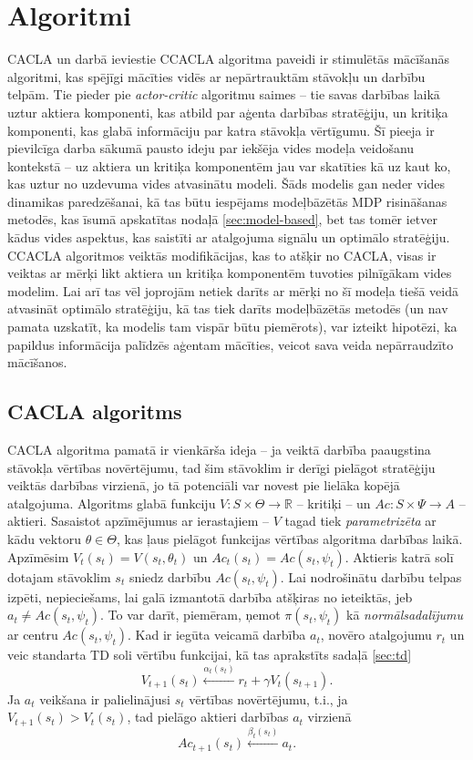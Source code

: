 \documentclass{ludis} %
\begin{document}
\chapter{Algoritmi}
CACLA un darbā ieviestie CCACLA algoritma paveidi ir stimulētās mācīšanās
algoritmi, kas spējīgi mācīties vidēs ar nepārtrauktām stāvokļu un darbību
telpām. Tie pieder pie \textit{actor-critic} algoritmu saimes -- tie savas
darbības laikā uztur aktiera komponenti, kas atbild par aģenta darbības
stratēģiju, un kritiķa komponenti, kas glabā informāciju par katra stāvokļa
vērtīgumu. Šī pieeja ir pievilcīga darba sākumā pausto ideju par iekšēja vides
modeļa veidošanu kontekstā -- uz aktiera un kritiķa komponentēm jau var
skatīties kā uz kaut ko, kas uztur no uzdevuma vides atvasinātu modeli. Šāds
modelis gan neder vides dinamikas paredzēšanai, kā tas būtu iespējams
modeļbāzētās MDP risināšanas metodēs, kas īsumā apskatītas nodaļā
\ref{sec:model-based}, bet tas tomēr ietver kādus vides aspektus, kas saistīti
ar atalgojuma signālu un optimālo stratēģiju. CCACLA algoritmos veiktās
modifikācijas, kas to atšķir no CACLA, visas ir veiktas ar mērķi likt aktiera un
kritiķa komponentēm tuvoties pilnīgākam vides modelim. Lai arī tas vēl joprojām
netiek darīts ar mērķi no šī modeļa tiešā veidā atvasināt optimālo stratēģiju,
kā tas tiek darīts modeļbāzētās metodēs (un nav pamata uzskatīt, ka modelis tam
vispār būtu piemērots), var izteikt hipotēzi, ka papildus informācija palīdzēs
aģentam mācīties, veicot sava veida nepārraudzīto mācīšanos.

\section{CACLA algoritms}
CACLA algoritma pamatā ir vienkārša ideja -- ja veiktā darbība paaugstina
stāvokļa vērtības novērtējumu, tad šim stāvoklim ir derīgi pielāgot stratēģiju
veiktās darbības virzienā, jo tā potenciāli var novest pie lielāka kopējā
atalgojuma.
Algoritms glabā funkciju $V:S \times \Theta \rightarrow \mathbb{R}$ -- kritiķi
-- un $Ac : S \times \Psi \rightarrow A$ -- aktieri. Sasaistot apzīmējumus ar
ierastajiem -- $V$ tagad tiek \textit{parametrizēta} ar kādu vektoru $\theta \in
\Theta$, kas ļaus pielāgot funkcijas vērtības algoritma darbības laikā.
Apzīmēsim $V_t(s_t) = V(s_t, \theta_t)$ un $Ac_t(s_t) = Ac(s_t, \psi_t)$.
Aktieris katrā solī dotajam stāvoklim $s_t$ sniedz darbību $Ac(s_t, \psi_t)$.
Lai nodrošinātu darbību telpas izpēti, nepieciešams, lai galā izmantotā darbība
atšķiras no ieteiktās, jeb $a_t \neq Ac(s_t, \psi_t)$. To var darīt, piemēram,
ņemot $\pi(s_t, \psi_t)$ kā \textit{normālsadalījumu} ar centru $Ac(s_t,
\psi_t)$. Kad ir iegūta veicamā darbība $a_t$, novēro atalgojumu $r_t$ un veic
standarta TD soli vērtību funkcijai, kā tas aprakstīts sadaļā \ref{sec:td}
\[
	V_{t+1}(s_t) \xleftarrow{\alpha_t(s_t)} r_t + \gamma V_t(s_{t + 1}).
\]
Ja $a_t$ veikšana ir palielinājusi $s_t$ vērtības novērtējumu, t.i., ja
$V_{t+1}(s_t) > V_t(s_t)$, tad pielāgo aktieri darbības $a_t$ virzienā
\[
	Ac_{t+1}(s_t) \xleftarrow{\beta_t(s_t)} a_t.
\]
\end{document}
